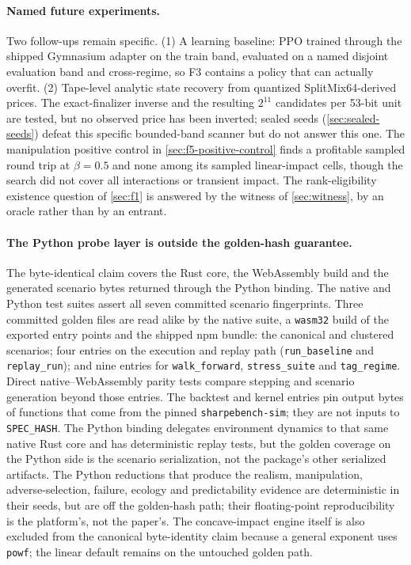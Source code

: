 \paragraph{Named future experiments.} Two follow-ups remain specific. (1) A learning baseline: PPO trained through the shipped Gymnasium adapter on the train band, evaluated on a named disjoint evaluation band and cross-regime, so F3 contains a policy that can actually overfit. (2) Tape-level analytic state recovery from quantized SplitMix64-derived prices. The exact-finalizer inverse and the resulting $2^{11}$ candidates per 53-bit unit are tested, but no observed price has been inverted; sealed seeds (\cref{sec:sealed-seeds}) defeat this specific bounded-band scanner but do not answer this one. The manipulation positive control in \cref{sec:f5-positive-control} finds a profitable sampled round trip at $\beta = 0.5$ and none among its sampled linear-impact cells, though the search did not cover all interactions or transient impact. The rank-eligibility existence question of \cref{sec:f1} is answered by the witness of \cref{sec:witness}, by an oracle rather than by an entrant.

\paragraph{The Python probe layer is outside the golden-hash guarantee.} The byte-identical claim covers the Rust core, the WebAssembly build and the generated scenario bytes returned through the Python binding. The native and Python test suites assert all seven committed scenario fingerprints. Three committed golden files are read alike by the native suite, a \texttt{wasm32} build of the exported entry points and the shipped npm bundle: the canonical and clustered scenarios; four entries on the execution and replay path (\texttt{run\_baseline} and \texttt{replay\_run}); and nine entries for \texttt{walk\_forward}, \texttt{stress\_suite} and \texttt{tag\_regime}. Direct native--WebAssembly parity tests compare stepping and scenario generation beyond those entries. The backtest and kernel entries pin output bytes of functions that come from the pinned \texttt{sharpebench-sim}; they are not inputs to \texttt{SPEC\_HASH}. The Python binding delegates environment dynamics to that same native Rust core and has deterministic replay tests, but the golden coverage on the Python side is the scenario serialization, not the package's other serialized artifacts. The Python reductions that produce the realism, manipulation, adverse-selection, failure, ecology and predictability evidence are deterministic in their seeds, but are off the golden-hash path; their floating-point reproducibility is the platform's, not the paper's. The concave-impact engine itself is also excluded from the canonical byte-identity claim because a general exponent uses \texttt{powf}; the linear default remains on the untouched golden path.

